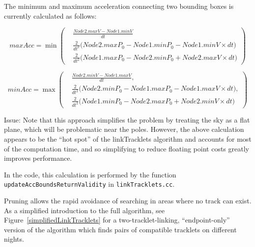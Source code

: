 The minimum and maximum acceleration connecting two bounding boxes is
currently calculated as follows:

\begin{equation}
maxAcc = \min  \left(\begin{array}{ccc} & \displaystyle \frac{Node2.maxV - Node1.minV}{dt} \\
& \displaystyle \frac{2}{dt^2} \bigg(Node2.maxP_0 - Node1.minP_0 - Node1.minV \times dt \bigg) \\
& \displaystyle \frac{2}{dt^2} \bigg(Node1.maxP_0 - Node2.minP_0 + Node2.maxV \times dt \bigg) \end{array}\right)
\label{maxAcc}
\end{equation}

\begin{equation}
minAcc  = \max  \left(\begin{array}{ccc} & \displaystyle \frac{Node2.minV - Node1.maxV}{dt},\\
& \displaystyle \frac{2}{dt^2} \bigg( Node2.minP_0 - Node1.maxP_0 - \displaystyle Node1.maxV \times dt\bigg), \\
& \displaystyle \frac{2}{dt^2} \bigg(Node1.minP_0 - Node2.maxP_0 + Node2.minV \times dt\bigg) \end{array} \right)
\label{minAcc}
\end{equation}


Issue: Note that this approach simplifies the problem by treating the sky as
a flat plane, which will be problematic near the poles.  However, the
above calculation appears to be the ``hot spot'' of the linkTracklets
algorithm and accounts for most of the computation time, and so
simplifying to reduce floating point costs greatly improves
performance.

In the code, this calculation is performed by the function 
{\tt updateAccBoundsReturnValidity} in {\tt linkTracklets.cc}.

Pruning allows the rapid avoidance of searching in areas where no track
can exist. As a simplified introduction to the
full algorithm, see Figure~\ref{simplifiedLinkTracklets} for a
two-tracklet-linking, ``endpoint-only'' version of the algorithm which
finds pairs of compatible tracklets on different nights.

